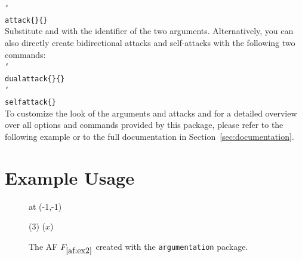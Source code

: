 \documentclass{scrartcl}
\newcommand{\argumentation}{\texttt{argumentation}\xspace}
\newcommand{\mopt}[2][red]{\textcolor{#1}{\ttfamily \meta{#2}}}
\DeclareRobustCommand\cs[2][-1.6cm]{\hspace{#1}\texttt{\char`\\#2}}
\begin{document}
\noindent\cs[0cm]{attack\{\mopt{a1}\}\{\mopt{a2}\}}\\

\noindent
Substitute \mopt{a1} and \mopt{a2} with the identifier of the two arguments.
Alternatively, you can also directly create bidirectional attacks and self-attacks with the following two commands:\\

\noindent\cs[0cm]{dualattack\{\mopt{a1}\}\{\mopt{a2}\}}\\
\noindent\cs[0cm]{selfattack\{\mopt{a1}\}}\\


To customize the look of the arguments and attacks and for a detailed overview over all options and commands provided by this package, please refer to the following example or to the full documentation in Section~\ref{sec:documentation}.


\newpage
\section{Example Usage}\label{sec:example}
\vspace{-0.5cm}
\begin{figure}[ht]
    \centering
    \begin{af}[namestyle=math]


         at (-1,-1)

        
        ($3$)
        ($x$)

        \label{af:ex2}
    \end{af}
    \caption{The AF $F_{\ref{af:ex2}}$ created with the \argumentation package.}
    \label{fig:example}
\end{figure}
\end{document}
